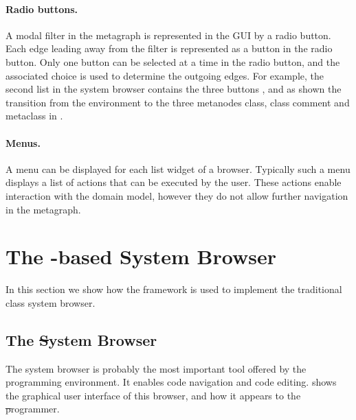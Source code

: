 \documentclass[a4paper,10pt,twoside]{book}
\begin{document}
\paragraph{Radio buttons.} A modal filter in the metagraph is represented in the GUI by a radio button. Each edge leading away from the filter is represented as a button in the radio button. Only one button can be selected at a time in the radio button, and the associated choice is used to determine the outgoing edges. For example, the second list in the system browser contains the three buttons ,  and  as shown the transition from the environment to the three metanodes class, class comment and metaclass in .

\paragraph{Menus.} A menu can be displayed for each list widget of a browser. Typically such a menu displays a list of actions that can be executed by the user. These actions enable interaction with the domain model, however they do not allow further navigation in the metagraph.






\section{The \ob-based System Browser} 

In this section we show how the framework is used to implement the traditional class system browser. 

\subsection{The \st System Browser}
The system browser is probably the most important tool offered by the \pharo programming environment. It enables code navigation and code editing.  shows the graphical user interface of this browser, and how it appears to the \st programmer. 
\end{document}
